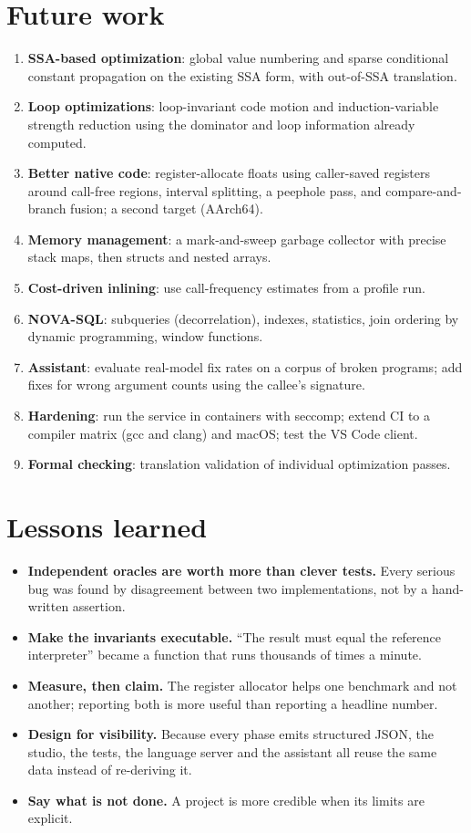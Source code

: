\section{Future work}
\begin{enumerate}
  \item \textbf{SSA-based optimization}: global value numbering and sparse conditional constant propagation on the existing SSA form, with out-of-SSA translation.
  \item \textbf{Loop optimizations}: loop-invariant code motion and induction-variable strength reduction using the dominator and loop information already computed.
  \item \textbf{Better native code}: register-allocate floats using caller-saved registers around call-free regions, interval splitting, a peephole pass, and compare-and-branch fusion; a second target (AArch64).
  \item \textbf{Memory management}: a mark-and-sweep garbage collector with precise stack maps, then structs and nested arrays.
  \item \textbf{Cost-driven inlining}: use call-frequency estimates from a profile run.
  \item \textbf{NOVA-SQL}: subqueries (decorrelation), indexes, statistics, join ordering by dynamic programming, window functions.
  \item \textbf{Assistant}: evaluate real-model fix rates on a corpus of broken programs; add fixes for wrong argument counts using the callee's signature.
  \item \textbf{Hardening}: run the service in containers with seccomp; extend CI to a compiler matrix (gcc and clang) and macOS; test the VS Code client.
  \item \textbf{Formal checking}: translation validation of individual optimization passes.
\end{enumerate}

\section{Lessons learned}
\begin{itemize}
  \item \textbf{Independent oracles are worth more than clever tests.} Every serious bug was found by disagreement between two implementations, not by a hand-written assertion.
  \item \textbf{Make the invariants executable.} ``The result must equal the reference interpreter'' became a function that runs thousands of times a minute.
  \item \textbf{Measure, then claim.} The register allocator helps one benchmark and not another; reporting both is more useful than reporting a headline number.
  \item \textbf{Design for visibility.} Because every phase emits structured JSON, the studio, the tests, the language server and the assistant all reuse the same data instead of re-deriving it.
  \item \textbf{Say what is not done.} A project is more credible when its limits are explicit.
\end{itemize}

